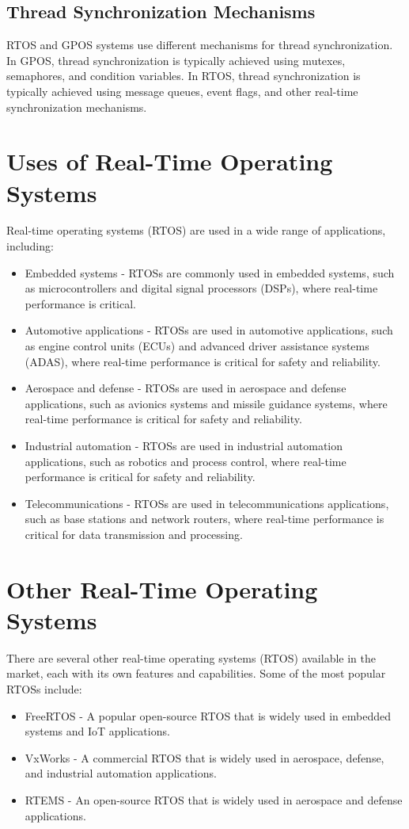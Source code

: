 \documentclass{article}
\begin{document}
\subsection{Thread Synchronization Mechanisms}
\label{sec:thread-synchronization}
RTOS and GPOS systems use different mechanisms for thread synchronization.
In GPOS, thread synchronization is typically achieved using mutexes, semaphores, and condition variables.
In RTOS, thread synchronization is typically achieved using message queues, event flags, and other real-time synchronization mechanisms.\cite{ThreadSynchronization}

\section{Uses of Real-Time Operating Systems}
\label{sec:uses-of-rtos}
Real-time operating systems (RTOS) are used in a wide range of applications, including:
\begin{itemize}
    \item  Embedded systems - RTOSs are commonly used in embedded systems, such as microcontrollers and digital signal processors (DSPs), where real-time performance is critical.
    \item  Automotive applications - RTOSs are used in automotive applications, such as engine control units (ECUs) and advanced driver assistance systems (ADAS), where real-time performance is critical for safety and reliability.
    \item  Aerospace and defense - RTOSs are used in aerospace and defense applications, such as avionics systems and missile guidance systems, where real-time performance is critical for safety and reliability.
    \item  Industrial automation - RTOSs are used in industrial automation applications, such as robotics and process control, where real-time performance is critical for safety and reliability.
    \item  Telecommunications - RTOSs are used in telecommunications applications, such as base stations and network routers, where real-time performance is critical for data transmission and processing.
\end{itemize}

\section{Other Real-Time Operating Systems}
\label{sec:other-rtos}
There are several other real-time operating systems (RTOS) available in the market, each with its own features and capabilities. Some of the most popular RTOSs include:
\begin{itemize}
    \item  FreeRTOS - A popular open-source RTOS that is widely used in embedded systems and IoT applications. \cite{FreeRTOS}
    \item  VxWorks - A commercial RTOS that is widely used in aerospace, defense, and industrial automation applications. \cite{VxWorks}
    \item  RTEMS - An open-source RTOS that is widely used in aerospace and defense applications. \cite{RTEMS}
\end{itemize}
\end{document}

